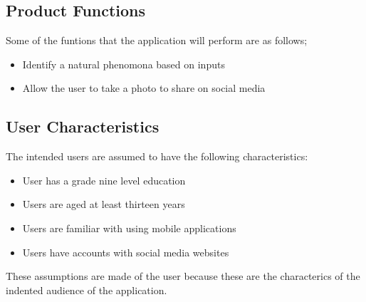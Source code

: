 \documentclass[]{article}
\begin{document}
\subsection{Product Functions}
\label{sub:product_functions}
Some of the funtions that the application will perform are as follows;
\begin{itemize}
\item Identify a natural phenomona based on inputs
\item Allow the user to take a photo to share on social media
\end{itemize}

\subsection{User Characteristics}
\label{sub:user_characteristics}
The intended users are assumed to have the following characteristics:
\begin{itemize}
	\item User has a grade nine level education
	\item Users are aged at least thirteen years
	\item Users are familiar with using mobile applications
	\item Users have accounts with social media websites 
	  
\end{itemize}
These assumptions are made of the user because these are the characterics of the indented audience of the application. 
\end{document}
